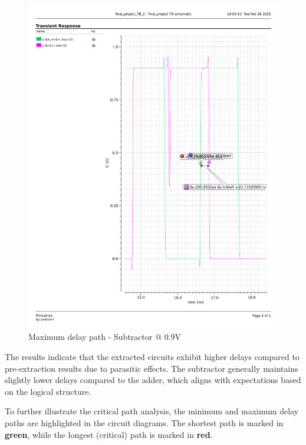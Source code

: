\documentclass[a4paper,12pt]{article}
\begin{document}
\begin{figure}[H]
\begin{minipage}{0.49\textwidth}
        \includegraphics[width=\textwidth]{delay/CP_max_sub_0.9.pdf}
        \caption{Maximum delay path - Subtractor @ 0.9V}
    \end{minipage}
\end{figure}

The results indicate that the extracted circuits exhibit higher delays compared to pre-extraction results due to parasitic effects. The subtractor generally maintains slightly lower delays compared to the adder, which aligns with expectations based on the logical structure.

To further illustrate the critical path analysis, the minimum and maximum delay paths are highlighted in the circuit diagrams. The shortest path is marked in \textbf{green}, while the longest (critical) path is marked in \textbf{red}.
\end{document}

